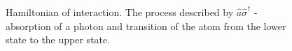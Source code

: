 \begin{figure}
\centering



\caption{Hamiltonian of interaction. The process described by $\hat{a}\hat{\sigma}^{\dag}$ - absorption
  of a photon and transition of the atom from the lower state to the upper state.}
\label{figPart1Ch2_2_2}
\end{figure}